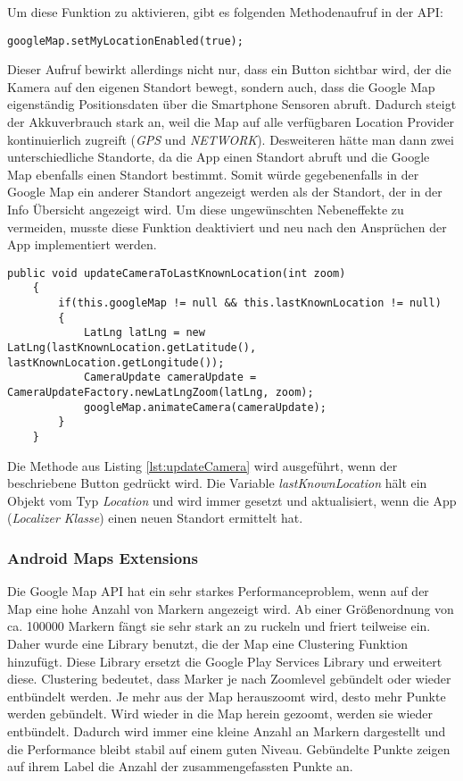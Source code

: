 Um diese Funktion zu aktivieren, gibt es folgenden Methodenaufruf in der API: 

\begin{lstlisting}[caption={},label=lst:setMyLocationEnabled]
	googleMap.setMyLocationEnabled(true);
\end{lstlisting}

Dieser Aufruf bewirkt allerdings nicht nur, dass ein Button sichtbar wird, der die Kamera auf den eigenen Standort bewegt, sondern auch, dass die Google Map eigenständig Positionsdaten über die Smartphone Sensoren abruft. Dadurch steigt der Akkuverbrauch stark an, weil die Map auf alle verfügbaren Location Provider kontinuierlich zugreift (\textit{GPS} und \textit{NETWORK}). Desweiteren hätte man dann zwei unterschiedliche Standorte, da die App einen Standort abruft und die Google Map ebenfalls einen Standort bestimmt. Somit würde gegebenenfalls in der Google Map ein anderer Standort angezeigt werden als der Standort, der in der Info Übersicht angezeigt wird. Um diese ungewünschten Nebeneffekte zu vermeiden, musste diese Funktion deaktiviert und neu nach den Ansprüchen der App implementiert werden.

\begin{lstlisting}[caption={"Kamera auf letzte bekannte Position setzen"},label=lst:updateCamera]
	public void updateCameraToLastKnownLocation(int zoom)
	{
		if(this.googleMap != null && this.lastKnownLocation != null)
		{
			LatLng latLng = new LatLng(lastKnownLocation.getLatitude(), 					lastKnownLocation.getLongitude());
		    CameraUpdate cameraUpdate = CameraUpdateFactory.newLatLngZoom(latLng, zoom);
		    googleMap.animateCamera(cameraUpdate);
		}
	}
\end{lstlisting}

Die Methode aus Listing \ref{lst:updateCamera} wird ausgeführt, wenn der beschriebene Button gedrückt wird. Die Variable \textit{lastKnownLocation} hält ein Objekt vom Typ \textit{Location} und wird immer gesetzt und aktualisiert, wenn die App (\textit{Localizer Klasse}) einen neuen Standort ermittelt hat. 

\subsubsection{Android Maps Extensions}

Die Google Map API hat ein sehr starkes Performanceproblem, wenn auf der Map eine hohe Anzahl von Markern angezeigt wird. Ab einer Größenordnung von ca. 100000 Markern fängt sie sehr stark an zu ruckeln und friert teilweise ein. Daher wurde eine Library benutzt, die der Map eine Clustering Funktion hinzufügt. Diese Library ersetzt die Google Play Services Library und erweitert diese. Clustering bedeutet, dass Marker je nach Zoomlevel gebündelt oder wieder entbündelt werden. Je mehr aus der Map herauszoomt wird, desto mehr Punkte werden gebündelt. Wird wieder in die Map herein gezoomt, werden sie wieder entbündelt. Dadurch wird immer eine kleine Anzahl an Markern dargestellt und die Performance bleibt stabil auf einem guten Niveau. Gebündelte Punkte zeigen auf ihrem Label die Anzahl der zusammengefassten Punkte an.

